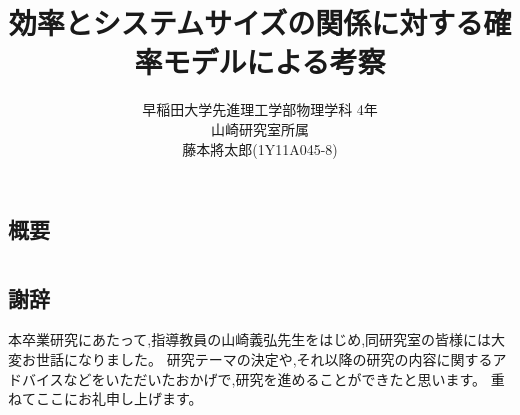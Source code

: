 \documentclass[a4j,11pt,onecolumn,oneside,openany]{jsbook}
\title{効率とシステムサイズの関係に対する確率モデルによる考察}
\author{早稲田大学先進理工学部物理学科 4年\\
山崎研究室所属\\
藤本將太郎(1Y11A045-8)}
\begin{document}
\maketitle
\thispagestyle{empty}
\newpage
\section*{概要}

\newpage
{}
\tableofcontents
\newpage
{}





\newpage
\chapter*{}
\section*{謝辞}
本卒業研究にあたって,指導教員の山崎義弘先生をはじめ,同研究室の皆様には大変お世話になりました。
研究テーマの決定や,それ以降の研究の内容に関するアドバイスなどをいただいたおかげで,研究を進めることができたと思います。
重ねてここにお礼申し上げます。
\end{document}
